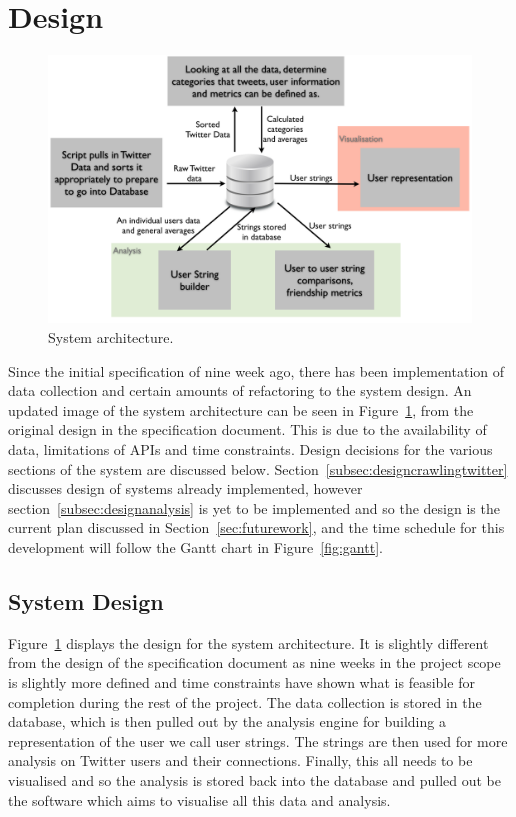 \documentclass[a4paper]{article}
\begin{document}
\section{Design}
\begin{figure}
	\centering
	     \includegraphics[scale=0.45]{architecture.png}
	  \caption{System architecture.}
	  \label{fig:arch}
\end{figure}
Since the initial specification of nine week ago, there has been implementation of data collection and certain amounts of refactoring to the system design. An updated image of the system architecture can be seen in Figure~\ref{fig:arch}, from the original design in the specification document. This is due to the availability of data, limitations of APIs and time constraints. Design decisions for the various sections of the system are discussed below. Section~\ref{subsec:designcrawlingtwitter} discusses design of systems already implemented, however section~\ref{subsec:designanalysis} is yet to be implemented and so the design is the current plan discussed in Section~\ref{sec:futurework}, and the time schedule for this development will follow the Gantt chart in Figure~\ref{fig:gantt}.
\subsection{System Design}
Figure~\ref{fig:arch} displays the design for the system architecture. It is slightly different from the design of the specification document as nine weeks in the project scope is slightly more defined and time constraints have shown what is feasible for completion during the rest of the project. The data collection is stored in the database, which is then pulled out by the analysis engine for building a representation of the user we call user strings. The strings are then used for more analysis on Twitter users and their connections. Finally, this all needs to be visualised and so the analysis is stored back into the database and pulled out be the software which aims to visualise all this data and analysis.
\end{document}
